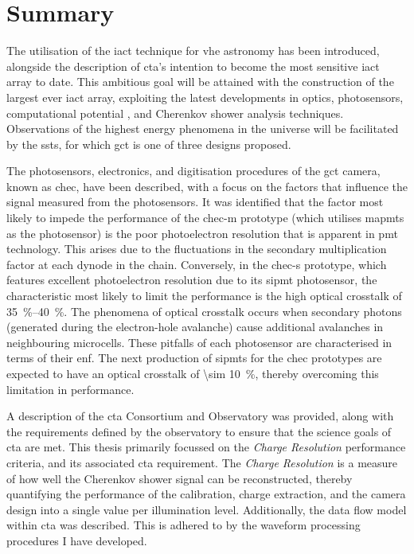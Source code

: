 \chapter{\label{ch9-summary}Summary} 

The utilisation of the \gls{iact} technique for \gls{vhe} astronomy has been introduced, alongside the description of \gls{cta}'s intention to become the most sensitive \gls{iact} array to date. This ambitious goal will be attained with the construction of the largest ever \gls{iact} array, exploiting the latest developments in optics, photosensors, computational potential , and Cherenkov shower analysis techniques. Observations of the highest energy phenomena in the universe will be facilitated by the \glspl{sst}, for which \gls{gct} is one of three designs proposed.

The photosensors, electronics, and digitisation procedures of the \gls{gct} camera, known as \gls{chec}, have been described, with a focus on the factors that influence the signal measured from the photosensors. It was identified that the factor most likely to impede the performance of the \gls{chec-m} prototype (which utilises \glspl{mapmt} as the photosensor) is the poor photoelectron resolution that is apparent in \gls{pmt} technology. This arises due to the fluctuations in the secondary multiplication factor at each dynode in the chain. Conversely, in the \gls{chec-s} prototype, which features excellent photoelectron resolution due to its \gls{sipmt} photosensor, the characteristic most likely to limit the performance is the high optical crosstalk of \SIrange{35}{40}{\percent}. The phenomena of optical crosstalk occurs when secondary photons (generated during the electron-hole avalanche) cause additional avalanches in neighbouring microcells. These pitfalls of each photosensor are characterised in terms of their \gls{enf}. The next production of \glspl{sipmt} for the \gls{chec} prototypes are expected to have an optical crosstalk of \SI{\sim 10}{\percent}, thereby overcoming this limitation in performance.

A description of the \gls{cta} Consortium and Observatory was provided, along with the requirements defined by the observatory to ensure that the science goals of \gls{cta} are met. This thesis primarily focussed on the \textit{Charge Resolution} performance criteria, and its associated \gls{cta} requirement. The \textit{Charge Resolution} is a measure of how well the Cherenkov shower signal can be reconstructed, thereby quantifying the performance of the calibration, charge extraction, and the camera design into a single value per illumination level. Additionally, the data flow model within \gls{cta} was described. This is adhered to by the waveform processing procedures I have developed.

